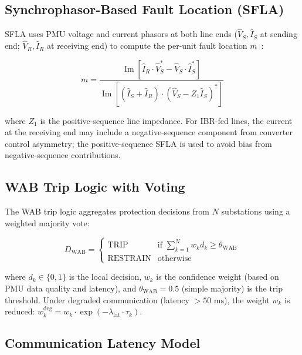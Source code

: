 \documentclass[11pt, a4paper]{article}
\newcommand{\ms}{\,\text{ms}}
\begin{document}
\subsection{Synchrophasor-Based Fault Location (SFLA)}

SFLA uses PMU voltage and current phasors at both line ends
($\hat{V}_S, \hat{I}_S$ at sending end; $\hat{V}_R, \hat{I}_R$ at receiving end)
to compute the per-unit fault location $m$~\cite{Salim2008}:

\begin{equation}
  m = \frac{\operatorname{Im}[\hat{I}_R \cdot \hat{V}_S^*
    - \hat{V}_S \cdot \hat{I}_S^*]}
    {\operatorname{Im}[(\hat{I}_S + \hat{I}_R) \cdot
    (\hat{V}_S - Z_1 \hat{I}_S)^*]}
  \label{eq:sfla}
\end{equation}

\noindent where $Z_1$ is the positive-sequence line impedance.
For IBR-fed lines, the current at the receiving end may include a negative-sequence
component from converter control asymmetry; the positive-sequence SFLA is used
to avoid bias from negative-sequence contributions.

\subsection{WAB Trip Logic with Voting}

The WAB trip logic aggregates protection decisions from $N$ substations
using a weighted majority vote:

\begin{equation}
  D_{\mathrm{WAB}} = \begin{cases}
    \mathrm{TRIP} & \text{if } \sum_{k=1}^N w_k d_k \geq \theta_{\mathrm{WAB}} \\
    \mathrm{RESTRAIN} & \text{otherwise}
  \end{cases}
  \label{eq:wab}
\end{equation}

\noindent where $d_k \in \{0, 1\}$ is the local decision, $w_k$ is the
confidence weight (based on PMU data quality and latency), and
$\theta_{\mathrm{WAB}} = 0.5$ (simple majority) is the trip threshold.
Under degraded communication (latency $> 50\,\ms$), the weight $w_k$ is
reduced: $w_k^{\mathrm{deg}} = w_k \cdot \exp(-\lambda_{\mathrm{lat}} \cdot \tau_k)$.

\subsection{Communication Latency Model}
\end{document}
